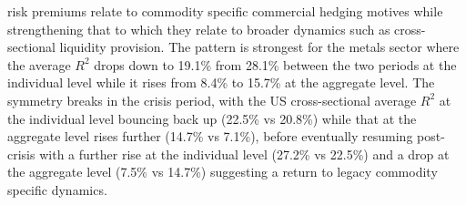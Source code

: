 \documentclass[
  authoryear,
  preprint,
  3p]{elsarticle}
\begin{document}
risk premiums relate to commodity specific commercial hedging motives
while strengthening that to which they relate to broader dynamics such
as cross-sectional liquidity provision. The pattern is strongest for the
metals sector where the average \(R^{2}\) drops down to 19.1\% from
28.1\% between the two periods at the individual level while it rises
from 8.4\% to 15.7\% at the aggregate level. The symmetry breaks in the
crisis period, with the US cross-sectional average \(R^{2}\) at the
individual level bouncing back up (22.5\% vs 20.8\%) while that at the
aggregate level rises further (14.7\% vs 7.1\%), before eventually
resuming post-crisis with a further rise at the individual level (27.2\%
vs 22.5\%) and a drop at the aggregate level (7.5\% vs 14.7\%)
suggesting a return to legacy commodity specific dynamics.

\bigskip
\bigskip
\end{document}

